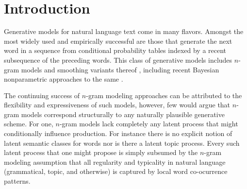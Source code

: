 \section{Introduction}


Generative models for natural language text come in many flavors.  Amongst the most widely used and empirically successful are those that  generate the next word in a sequence from conditional probability tables indexed by a recent subsequence of the preceding words.  This class of generative models includes $n$-gram models  and smoothing variants thereof \cite{Kneser1995,MacKay1995,Chen1998}, including recent Bayesian nonparametric approaches to the same \cite{Teh2006a,Wood2009}.  

The continuing success of $n$-gram modeling approaches can be attributed to the flexibility and expressiveness of such models, however, few would argue that $n$-gram models correspond structurally to any naturally plausible generative scheme.   For one, $n$-gram models lack completely any latent process that might conditionally influence production.  For instance there is no explicit notion of latent semantic classes for words nor is there a latent topic process.  Every such latent process that one might propose is simply subsumed by the $n$-gram modeling assumption that all regularity and typicality in natural language (grammatical, topic, and otherwise) is captured by local word co-ocurrence patterns.  


